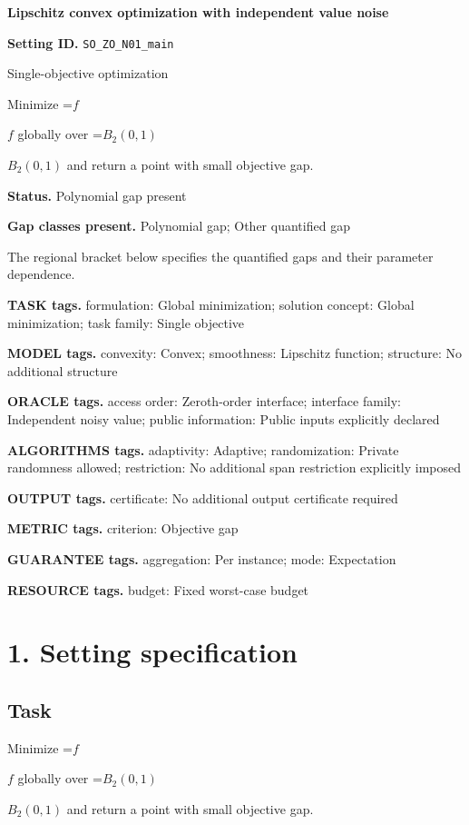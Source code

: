 \documentclass[10pt,a4paper]{article}
\newcommand{\AtlasMath}[1]{\par\begingroup\centering\setbox0=\hbox{$\displaystyle #1$}\ifdim\wd0>1.4\linewidth\typeout{ATLAS WIDE FORMULA: \the\wd0}\fi\ifdim\wd0>\linewidth\resizebox{\linewidth}{!}{\box0}\else\box0\fi\par\endgroup}
\newcommand{\AtlasInlineMath}[1]{\begingroup\setbox0=\hbox{$#1$}\ifdim\wd0>.4\linewidth\endgroup\AtlasMath{#1}\else\endgroup$#1$\fi}
\begin{document}
\raggedright

{\LARGE\bfseries\sffamily\color{AtlasNavy} Lipschitz convex optimization with independent value noise\par}\vspace{5pt}
\textbf{Setting ID.} \texttt{SO\_\allowbreak{}ZO\_\allowbreak{}N01\_\allowbreak{}main}

Single-objective optimization

Minimize \AtlasInlineMath{f} globally over \AtlasInlineMath{B_2(0,1)} and return a point with small objective gap.

\textbf{Status.} Polynomial gap present

\textbf{Gap classes present.} Polynomial gap; Other quantified gap

The regional bracket below specifies the quantified gaps and their parameter dependence.

\textbf{TASK tags.} formulation: Global minimization; solution concept: Global minimization; task family: Single objective

\textbf{MODEL tags.} convexity: Convex; smoothness: Lipschitz function; structure: No additional structure

\textbf{ORACLE tags.} access order: Zeroth-order interface; interface family: Independent noisy value; public information: Public inputs explicitly declared

\textbf{ALGORITHMS tags.} adaptivity: Adaptive; randomization: Private randomness allowed; restriction: No additional span restriction explicitly imposed

\textbf{OUTPUT tags.} certificate: No additional output certificate required

\textbf{METRIC tags.} criterion: Objective gap

\textbf{GUARANTEE tags.} aggregation: Per instance; mode: Expectation

\textbf{RESOURCE tags.} budget: Fixed worst-case budget

\section{1. Setting specification}
\subsection{Task}
Minimize \AtlasInlineMath{f} globally over \AtlasInlineMath{B_2(0,1)} and return a point with small objective gap.
\end{document}
